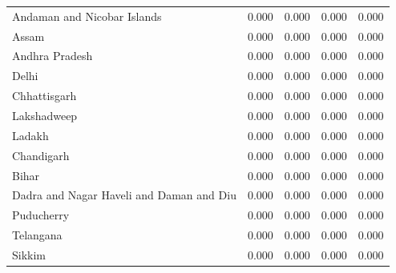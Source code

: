 \begin{tabular}{lrrrr}
Andaman and Nicobar Islands & 0.000 & 0.000 & 0.000 & 0.000 \\
Assam & 0.000 & 0.000 & 0.000 & 0.000 \\
Andhra Pradesh & 0.000 & 0.000 & 0.000 & 0.000 \\
Delhi & 0.000 & 0.000 & 0.000 & 0.000 \\
Chhattisgarh & 0.000 & 0.000 & 0.000 & 0.000 \\
Lakshadweep & 0.000 & 0.000 & 0.000 & 0.000 \\
Ladakh & 0.000 & 0.000 & 0.000 & 0.000 \\
Chandigarh & 0.000 & 0.000 & 0.000 & 0.000 \\
Bihar & 0.000 & 0.000 & 0.000 & 0.000 \\
Dadra and Nagar Haveli and Daman and Diu & 0.000 & 0.000 & 0.000 & 0.000 \\
Puducherry & 0.000 & 0.000 & 0.000 & 0.000 \\
Telangana & 0.000 & 0.000 & 0.000 & 0.000 \\
Sikkim & 0.000 & 0.000 & 0.000 & 0.000 \\
\bottomrule
\end{tabular}
